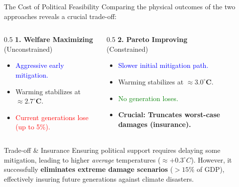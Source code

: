 \documentclass[aspectratio=1610]{beamer}
\begin{document}
\begin{frame}{The Cost of Political Feasibility}
    Comparing the physical outcomes of the two approaches reveals a crucial trade-off: \newline
    
    \begin{columns}[t] 
    
        \begin{column}{0.5\textwidth}
            \textbf{1. Welfare Maximizing} \\ (Unconstrained)
            \begin{itemize}
                \item \textcolor{blue}{Aggressive early mitigation.}
                \item Warming stabilizes at $\mathbf{\approx 2.7^\circ C}$.
                \item \textcolor{red}{Current generations lose (up to 5\%).}
            \end{itemize}
        \end{column}
        
        \begin{column}{0.5\textwidth}
            \textbf{2. Pareto Improving} \\ (Constrained)
            \begin{itemize}
                \item \textcolor{blue}{Slower initial mitigation path.}
                \item Warming stabilizes at $\mathbf{\approx 3.0^\circ C}$.
                \item \textcolor{green}{No generation loses.}
                \item \textbf{\textcolor{uzhorange}{Crucial: Truncates worst-case damages (insurance).}}
            \end{itemize}
        \end{column}
    \end{columns}
    
    \vspace{1em}

    \begin{alertblock}{Trade-off \& Insurance}
        Ensuring political support requires delaying some mitigation, leading to higher \textit{average} temperatures ($\approx +0.3^\circ C$). However, it successfully \textbf{eliminates extreme damage scenarios} ($>15\%$ of GDP), effectively insuring future generations against climate disasters.
    \end{alertblock}
\end{frame}
\end{document}

